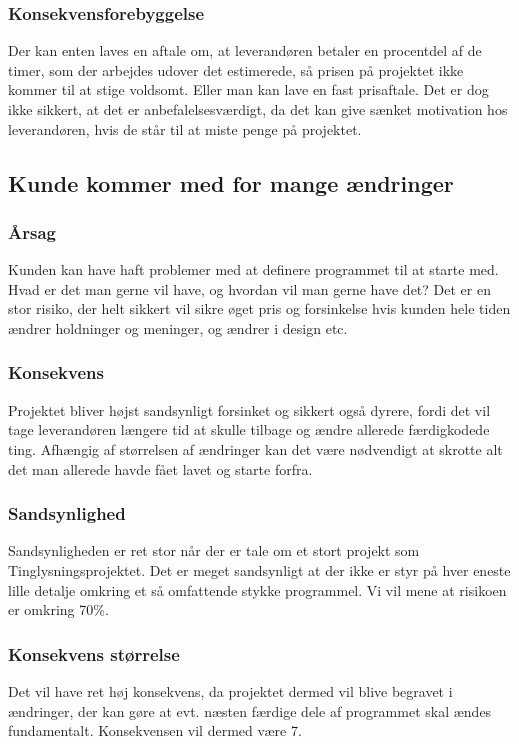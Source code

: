 \documentclass[10pt,a4paper,danish]{article}
\begin{document}
\subsubsection{Konsekvensforebyggelse}
Der kan enten laves en aftale om, at leverandøren betaler en procentdel af de timer, som der arbejdes udover det estimerede, så prisen på projektet ikke kommer til at stige voldsomt.
Eller man kan lave en fast prisaftale. Det er dog ikke sikkert, at det er anbefalelsesværdigt, da det kan give sænket motivation hos leverandøren, hvis de står til at miste penge på projektet.


\subsection{Kunde kommer med for mange ændringer}
\subsubsection{Årsag}
Kunden kan have haft problemer med at definere programmet til at starte med. Hvad er det man gerne vil have, og hvordan vil man gerne have det? Det er en stor risiko, der helt sikkert vil sikre øget pris og forsinkelse hvis kunden hele tiden ændrer holdninger og meninger, og ændrer i design etc.

\subsubsection{Konsekvens}
Projektet bliver højst sandsynligt forsinket og sikkert også dyrere, fordi det vil tage leverandøren længere tid at skulle tilbage og ændre allerede færdigkodede ting. Afhængig af størrelsen af ændringer kan det være nødvendigt at skrotte alt det man allerede havde fået lavet og starte forfra.

\subsubsection{Sandsynlighed}
Sandsynligheden er ret stor når der er tale om et stort projekt som Tinglysningsprojektet. Det er meget sandsynligt at der ikke er styr på hver eneste lille detalje omkring et så omfattende stykke programmel. Vi vil mene at risikoen er omkring 70\%.

\subsubsection{Konsekvens størrelse}
Det vil have ret høj konsekvens, da projektet dermed vil blive begravet i ændringer, der kan gøre at evt. næsten færdige dele af programmet skal ændes fundamentalt. Konsekvensen vil dermed være 7.
\end{document}
